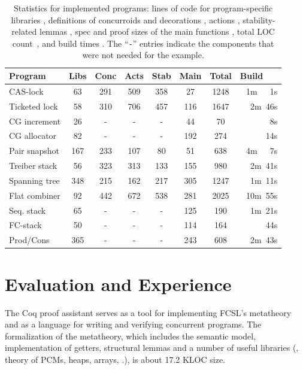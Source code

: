 {
\setlength{\belowcaptionskip}{-10pt} 
\begin{table}
{%
\sffamily\small %
\centering
\begin{tabular}{|@{\ }l@{\ }||@{\ }c@{\ }|@{\ }c@{\ }|@{\ }c@{\ }|@{\ }c@{\ }|@{\ }c@{\ }|@{\ }c@{\ }||@{\ }r@{\ }|}
  \hline
  \textbf{Program} &  
  {Libs} & {Conc} & {Acts} &
  {Stab} & {Main} & \textbf{Total}
  & \textbf{Build~~~}   
  \\ \hline \hline 
  CAS-lock & 63 & 291 & 509 & 358 & 27 & 1248 & 1m~~~1s
  \\
  Ticketed lock & 58 & 310 & 706 & 457 & 116 & 1647 & 2m~46s
  \\
  CG increment & 26 & - & - & - & 44 & 70 & 8s
  \\
  CG allocator & 82 & - & - & - & 192 & 274 & 14s
  \\
  Pair snapshot & 167 & 233 & 107 & 80 & 51 & 638 & 4m~~~7s 
  \\
  Treiber stack & 56 & 323 & 313 & 133  & 155 & 980 & 2m~41s
  \\
  Spanning tree & 348 & 215 & 162 & 217 & 305 & 1247 & 1m~11s
  \\
  Flat combiner & 92 & 442 & 672 & 538 & 281 & 2025 &  10m~55s
  \\ 
  Seq. stack & 65 & - & - & - & 125 & 190 & 1m~21s
  \\
  FC-stack & 50 & - & - & - & 114 & 164 & 44s
  \\
  Prod/Cons & 365 & - & - & - & 243 & 608 & 2m~43s
  \\[2pt] \hline
\end{tabular}
\caption{
  Statistics for implemented programs: lines of code for program-specific libraries ,
  definitions of concurroids and decorations , actions ,
  stability-related lemmas , spec and proof sizes of the main
  functions , total LOC count~, and build
  times . The ``\texttt{-}'' entries indicate the
  components that were not needed for the example.
} 
\label{tab:locs}
}
\end{table}}

\section{Evaluation and Experience}
\label{sec:eval-exper}

%
The Coq proof assistant serves as a tool for implementing FCSL's
metatheory and as a language for writing and verifying concurrent
programs.
%
The formalization of the metatheory, which includes the semantic
model, implementation of getters, structural lemmas and a number of
useful libraries (\eg, theory of PCMs, heaps, arrays, \etc.),
is about 17.2 KLOC size.

